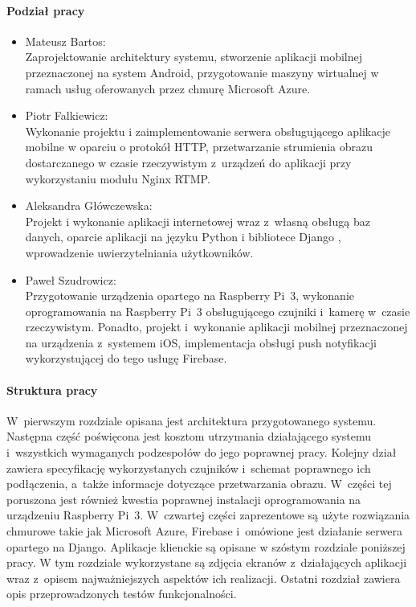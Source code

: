 \paragraph{Podział pracy}
\begin{itemize}
\item Mateusz Bartos: \\
Zaprojektowanie architektury systemu, stworzenie aplikacji mobilnej przeznaczonej na system Android, przygotowanie maszyny wirtualnej w ramach usług oferowanych przez chmurę Microsoft Azure.
\item Piotr Falkiewicz: \\
Wykonanie projektu i zaimplementowanie serwera obsługującego aplikacje mobilne w oparciu o protokół HTTP, przetwarzanie strumienia obrazu dostarczanego w czasie rzeczywistym z~urządzeń do aplikacji przy wykorzystaniu modułu Nginx RTMP.
\item Aleksandra Główczewska: \\
Projekt i wykonanie aplikacji internetowej wraz z~własną obsługą baz danych, oparcie aplikacji na języku Python i bibliotece Django \cite{djangoREST}, wprowadzenie uwierzytelniania użytkowników.
\item Paweł Szudrowicz: \\
Przygotowanie urządzenia opartego na Raspberry Pi~3, wykonanie oprogramowania na Raspberry Pi~3 obsługującego czujniki i~kamerę w~czasie rzeczywistym. Ponadto, projekt i~wykonanie aplikacji mobilnej przeznaczonej na urządzenia z~systemem iOS, implementacja obsługi push notyfikacji wykorzystującej do tego usługę Firebase.
\end{itemize}

\paragraph{Struktura pracy}
W~pierwszym rozdziale opisana jest architektura przygotowanego systemu. Następna część poświęcona jest kosztom utrzymania działającego systemu i~wszystkich wymaganych podzespołów do jego poprawnej pracy. Kolejny dział zawiera specyfikację wykorzystanych czujników i~schemat poprawnego ich podłączenia, a~także informacje dotyczące przetwarzania obrazu. W~części tej poruszona jest również kwestia poprawnej instalacji oprogramowania na urządzeniu Raspberry Pi~3.  W~czwartej części zaprezentowe są użyte rozwiązania chmurowe takie jak Microsoft Azure, Firebase i~omówione jest działanie serwera opartego na Django. Aplikacje klienckie są opisane w szóstym rozdziale poniższej pracy. W tym rozdziale wykorzystane są zdjęcia ekranów z~działających aplikacji wraz z~opisem najważniejszych aspektów ich realizacji. Ostatni rozdział zawiera opis przeprowadzonych testów funkcjonalności.
